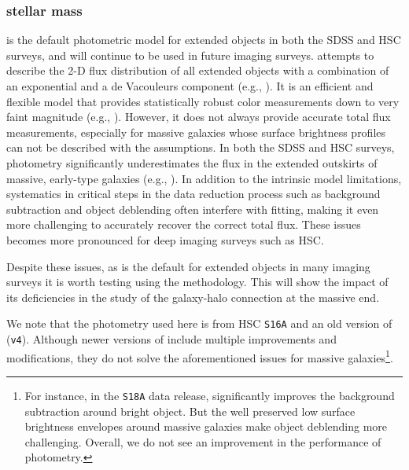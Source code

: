 \documentclass[fleqn,usenatbib,useAMS,english]{mnras}
\begin{document}
\subsubsection{\cmodel{} stellar mass}
    \label{sec:mcmodel}

    \cmodel{} is the default photometric model for extended objects in both the SDSS and HSC surveys,
    and will continue to be used in future imaging surveys.
    \cmodel{} attempts to describe the 2-D flux distribution of all extended objects with a
    combination of an exponential and a de Vacouleurs component (e.g., \citealt{HSC-PIPE}).
    It is an efficient and flexible model that provides statistically robust color measurements
    down to very faint magnitude (e.g., \citealt{SynPipe}).
    However, it does not always provide accurate total flux measurements, especially for
    massive galaxies whose surface brightness profiles can not be described with the \cmodel{}
    assumptions.
    In both the SDSS and HSC surveys, \cmodel{} photometry significantly underestimates the
    flux in the extended outskirts of massive, early-type galaxies (e.g., \citealt{Bernardi2013,
    Huang2018b}).
    In addition to the intrinsic model limitations, systematics in critical steps in
    the data reduction process such as background subtraction and object deblending often
    interfere with \cmodel{} fitting, making it even more challenging to accurately recover the
    correct total flux.
    These issues becomes more pronounced for deep imaging surveys such as HSC.

    Despite these issues, as \cmodel{} is the default for extended objects in many imaging
    surveys it is worth testing using the \topn{} methodology. This will show the impact of its
    deficiencies in the study of the galaxy-halo connection at the massive end.

    We note that the \cmodel{} photometry used here is from HSC \texttt{S16A} and an old
    version of \hscpipe{} (\texttt{v4}).
    Although newer versions of \hscpipe{} include multiple improvements and modifications,
    they do not solve the aforementioned issues for massive galaxies\footnote{ For instance, in the
    {\tt S18A} data release, \hscpipe{} significantly improves the background subtraction around
    bright object. But the well preserved low surface brightness envelopes around massive
    galaxies make object deblending more challenging. Overall, we do not see an improvement in
    the performance of \cmodel{} photometry. }.
\end{document}
